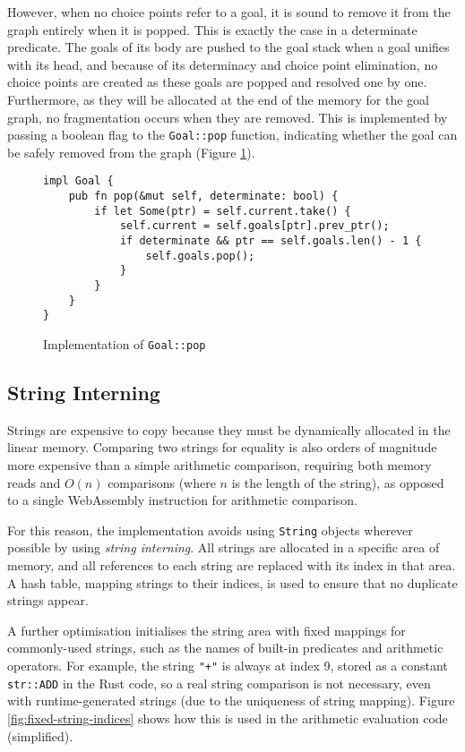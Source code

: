 However, when no choice points refer to a goal, it is sound to remove it from the graph entirely when it is popped. This is exactly the case in a determinate predicate. The goals of its body are pushed to the goal stack when a goal unifies with its head, and because of its determinacy and choice point elimination, no choice points are created as these goals are popped and resolved one by one. Furthermore, as they will be allocated at the end of the memory for the goal graph, no fragmentation occurs when they are removed. This is implemented by passing a boolean flag to the \texttt{Goal::pop} function, indicating whether the goal can be safely removed from the graph (Figure \ref{fig:goal-pop}).

\begin{figure}[H]
\centering
\begin{verbatim}
impl Goal {
    pub fn pop(&mut self, determinate: bool) {
        if let Some(ptr) = self.current.take() {
            self.current = self.goals[ptr].prev_ptr();
            if determinate && ptr == self.goals.len() - 1 {
                self.goals.pop();
            }
        }
    }
}
\end{verbatim}
\caption{Implementation of \texttt{Goal::pop}}
\label{fig:goal-pop}
\end{figure}

\subsection{String Interning}

Strings are expensive to copy because they must be dynamically allocated in the linear memory. Comparing two strings for equality is also orders of magnitude more expensive than a simple arithmetic comparison, requiring both memory reads and $O(n)$ comparisons (where $n$ is the length of the string), as opposed to a single WebAssembly instruction for arithmetic comparison.

For this reason, the implementation avoids using \texttt{String} objects wherever possible by using \emph{string interning}. All strings are allocated in a specific area of memory, and all references to each string are replaced with its index in that area. A hash table, mapping strings to their indices, is used to ensure that no duplicate strings appear.

A further optimisation initialises the string area with fixed mappings for commonly-used strings, such as the names of built-in predicates and arithmetic operators. For example, the string \texttt{"+"} is always at index 9, stored as a constant \texttt{str::ADD} in the Rust code, so a real string comparison is not necessary, even with runtime-generated strings (due to the uniqueness of string mapping). Figure \ref{fig:fixed-string-indices} shows how this is used in the arithmetic evaluation code (simplified).


